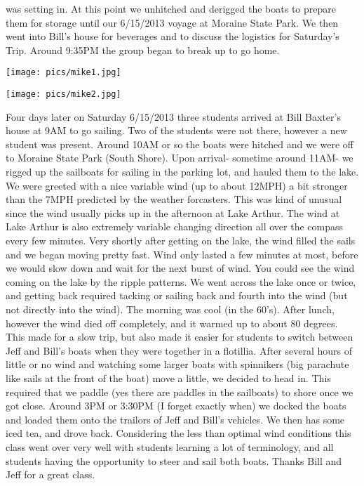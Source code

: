 \documentclass[10pt,a4paper]{article}
\newenvironment{Figure}
  {\par\medskip\noindent\minipage{\linewidth}}
  {\endminipage\par\medskip}
\begin{document}
\begin{multicols}{2}
was setting in.  At this point we unhitched and derigged the boats to prepare them for storage until our 6/15/2013 voyage at Moraine State Park.  We then went into Bill's house for beverages and to discuss the logistics for Saturday's Trip.  Around 9:35PM the group began to break up to go home.
 
 
 
\begin{Figure}
 \centering
 \texttt{[image: pics/mike1.jpg]}
\end{Figure}

\begin{Figure}
 \centering
 \texttt{[image: pics/mike2.jpg]}
\end{Figure}
 
Four days later on Saturday 6/15/2013 three students arrived at Bill Baxter's house at 9AM to go sailing.  Two of the students were not there, however a new student was present.  Around 10AM or so the boats were hitched and we were off to Moraine State Park (South Shore).  Upon arrival- sometime around 11AM- we rigged up the sailboats for sailing in the parking lot, and hauled them to the lake.  We were greeted with a nice variable wind (up to about 12MPH) a bit stronger than the 7MPH predicted by the weather forcasters.  This was kind of unusual since the wind usually picks up in the afternoon at Lake Arthur.  The wind at Lake Arthur is also extremely variable changing direction all over the compass every few minutes.  Very shortly after getting on the lake, the wind filled the sails and we began moving pretty fast.  Wind only lasted a few minutes at most, before we would slow down and wait for the next burst of wind.  You could see the wind coming on the lake by the ripple patterns.  We went across the lake once or twice, and getting back required tacking or sailing back and fourth into the wind (but not directly into the wind).  The morning was cool (in the 60's).  After lunch, however the wind died off completely, and it warmed up to about 80 degrees.  This made for a slow trip, but also made it easier for students to switch between Jeff and Bill's boats when they were together in a flotillia.  After several hours of little or no wind and watching some larger boats with spinnikers (big parachute like sails at the front of the boat) move a little, we decided to head in.  This required that we paddle (yes there are paddles in the sailboats) to shore once we got close.  Around 3PM or 3:30PM (I forget exactly when) we docked the boats and loaded them onto the trailors of Jeff and Bill's vehicles.  We then has some iced tea, and drove back.  Considering the less than optimal wind conditions this class went over very well with students learning a lot of terminology, and all students having the opportunity to steer and sail both boats.  Thanks Bill and Jeff for a great class.



\end{multicols}
\end{document}
